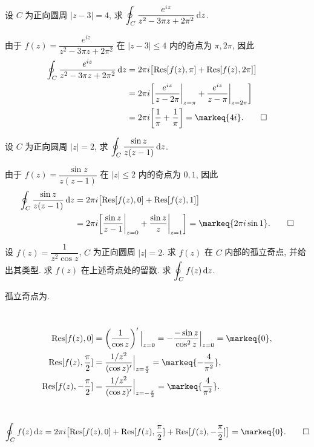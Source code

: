 \begin{exercise}
	设 $C$ 为正向圆周 $|z-3|=4$, 求 $\displaystyle\oint_C\frac{e^{iz}}{z^2-3\pi z+2\pi^2}\,\mathrm{d} z$.
\end{exercise}
\begin{solution}
	由于 $f(z)=\dfrac{e^{iz}}{z^2-3\pi z+2\pi^2}$ 在 $|z-3|\le 4$ 内的奇点为 $\pi,2\pi$, 因此
	\begin{align*}
		\oint_C\frac{e^{iz}}{z^2-3\pi z+2\pi^2}\diff z&=2\pi i\bigl[\Res[f(z),\pi]+\Res[f(z),2\pi]\bigr] \\
		&=2\pi i\biggl[\frac{e^{iz}}{z-2\pi}\bigg|_{z=\pi}+\frac{e^{iz}}{z-\pi}\bigg|_{z=2\pi}\biggr] \\
	&=2\pi i\biggl[\frac1\pi+\frac1\pi\biggr]=\markeq{4i}. \qedhere
	\end{align*}
\end{solution}


\begin{exercise}
	设 $C$ 为正向圆周 $|z|=2$, 求 $\displaystyle\oint_C\frac{\sin z}{z(z-1)}\,\mathrm{d} z$.
\end{exercise}
\begin{solution}
	由于 $f(z)=\dfrac{\sin z}{z(z-1)}$ 在 $|z|\le 2$ 内的奇点为 $0,1$, 因此
	\begin{align*}
		\oint_C\frac{\sin z}{z(z-1)}\diff z&=2\pi i\bigl[\Res[f(z),0]+\Res[f(z),1]\bigr] \\
		&=2\pi i\biggl[\frac{\sin z}{z-1}\bigg|_{z=0}+\frac{\sin z}{z}\bigg|_{z=1}\biggr]=\markeq{2\pi i\sin1}. \qedhere
	\end{align*}
\end{solution}


\begin{exercise}
	设 $f(z)=\dfrac1{z^2\cos z}$, $C$ 为正向圆周 $|z|=2$.
	\subex 求 $f(z)$ 在 $C$ 内部的孤立奇点, 并给出其类型.
	\subex 求 $f(z)$ 在上述奇点处的留数.
	\subex 求 $\displaystyle\oint_C f(z)\,\mathrm{d} z$.
\end{exercise}
\begin{solution}
	\subex 孤立奇点为.

	\subex~
	\begin{align*}
		\Res[f(z),0]&=\left(\frac1{\cos z}\right)'\Big|_{z=0}
		=-\frac{-\sin z}{\cos^2 z}\Big|_{z=0}=\markeq{0},\\
		\Res[f(z),\frac\pi2]&=\frac{1/z^2}{(\cos z)'}\Big|_{z=\frac\pi2}=\markeq{-\frac4{\pi^2}},\\
		\Res[f(z),-\frac\pi2]&=\frac{1/z^2}{(\cos z)'}\Big|_{z=-\frac\pi2}=\markeq{\frac4{\pi^2}}.
	\end{align*}

	\subex~
	\[\oint_Cf(z)\diff z=2\pi i\bigl[\Res[f(z),0]+\Res[f(z),\frac\pi2]+\Res[f(z),-\frac\pi2]\bigr]=\markeq{0}.\qedhere\]
\end{solution}


